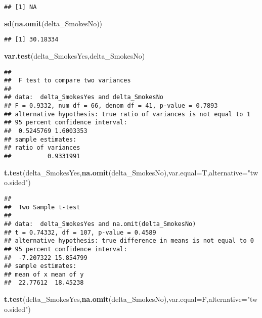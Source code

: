 \documentclass[]{article}
\newenvironment{Shaded}{\begin{snugshade}}{\end{snugshade}}
\newcommand{\KeywordTok}[1]{\textcolor[rgb]{0.13,0.29,0.53}{\textbf{#1}}}
\newcommand{\DataTypeTok}[1]{\textcolor[rgb]{0.13,0.29,0.53}{#1}}
\newcommand{\StringTok}[1]{\textcolor[rgb]{0.31,0.60,0.02}{#1}}
\newcommand{\NormalTok}[1]{#1}
\begin{document}
\begin{verbatim}
## [1] NA
\end{verbatim}

\begin{Shaded}
\begin{Highlighting}[]
\KeywordTok{sd}\NormalTok{(}\KeywordTok{na.omit}\NormalTok{(delta_SmokesNo))}
\end{Highlighting}
\end{Shaded}

\begin{verbatim}
## [1] 30.18334
\end{verbatim}

\begin{Shaded}
\begin{Highlighting}[]
\KeywordTok{var.test}\NormalTok{(delta_SmokesYes,delta_SmokesNo)}
\end{Highlighting}
\end{Shaded}

\begin{verbatim}
## 
##  F test to compare two variances
## 
## data:  delta_SmokesYes and delta_SmokesNo
## F = 0.9332, num df = 66, denom df = 41, p-value = 0.7893
## alternative hypothesis: true ratio of variances is not equal to 1
## 95 percent confidence interval:
##  0.5245769 1.6003353
## sample estimates:
## ratio of variances 
##          0.9331991
\end{verbatim}

\begin{Shaded}
\begin{Highlighting}[]
\KeywordTok{t.test}\NormalTok{(delta_SmokesYes,}\KeywordTok{na.omit}\NormalTok{(delta_SmokesNo),}\DataTypeTok{var.equal=}\NormalTok{T,}\DataTypeTok{alternative=}\StringTok{"two.sided"}\NormalTok{)}
\end{Highlighting}
\end{Shaded}

\begin{verbatim}
## 
##  Two Sample t-test
## 
## data:  delta_SmokesYes and na.omit(delta_SmokesNo)
## t = 0.74332, df = 107, p-value = 0.4589
## alternative hypothesis: true difference in means is not equal to 0
## 95 percent confidence interval:
##  -7.207322 15.854799
## sample estimates:
## mean of x mean of y 
##  22.77612  18.45238
\end{verbatim}

\begin{Shaded}
\begin{Highlighting}[]
\KeywordTok{t.test}\NormalTok{(delta_SmokesYes,}\KeywordTok{na.omit}\NormalTok{(delta_SmokesNo),}\DataTypeTok{var.equal=}\NormalTok{F,}\DataTypeTok{alternative=}\StringTok{"two.sided"}\NormalTok{)}
\end{Highlighting}
\end{Shaded}
\end{document}
